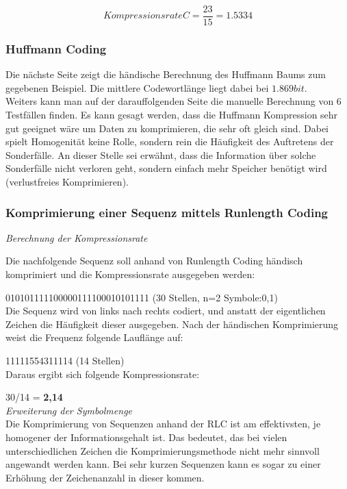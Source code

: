 \documentclass[12pt,german]{article}
\begin{document}
\begin{equation}[H]
 Kompressionsrate C = \frac{23}{15} = 1.5334	
\end{equation}


\subsubsection{Huffmann Coding}

Die nächste Seite zeigt die händische Berechnung des Huffmann Baums zum gegebenen Beispiel. Die mittlere Codewortlänge liegt dabei bei $1.869 bit $. \\

Weiters kann man auf der darauffolgenden Seite die manuelle Berechnung von 6 Testfällen finden. Es kann gesagt werden, dass die Huffmann Kompression sehr gut geeignet wäre um Daten zu komprimieren, die sehr oft gleich sind. Dabei spielt Homogenität keine Rolle, sondern rein die Häufigkeit des Auftretens der Sonderfälle. An dieser Stelle sei erwähnt, dass die Information über solche Sonderfälle nicht verloren geht, sondern einfach mehr Speicher benötigt wird (verlustfreies Komprimieren).


\label{fig:huffmannCalculation}


\label{fig:huffmannCalculation}


\subsubsection{Komprimierung einer Sequenz mittels Runlength Coding}
\textit{Berechnung der Kompressionsrate} 

Die nachfolgende Sequenz soll anhand von Runlength Coding händisch komprimiert und die Kompressionsrate ausgegeben werden:

010101111100000111100010101111 (30 Stellen, n=2 Symbole:0,1) \\

Die Sequenz wird von links nach rechts codiert, und anstatt der eigentlichen Zeichen die Häufigkeit dieser ausgegeben. Nach der händischen Komprimierung weist die Frequenz folgende Lauflänge auf:

11111554311114 (14 Stellen)\\


Daraus ergibt sich folgende Kompressionsrate:

30/14 = \textbf{ 2,14}\\

\textit{Erweiterung der Symbolmenge}\\
Die Komprimierung von Sequenzen anhand der RLC ist am effektivsten, je homogener der Informationsgehalt ist. Das bedeutet, das bei vielen unterschiedlichen Zeichen die Komprimierungsmethode nicht mehr sinnvoll angewandt werden kann. Bei sehr kurzen Sequenzen kann es sogar zu einer Erhöhung der Zeichenanzahl in dieser kommen.\\
\end{document}
